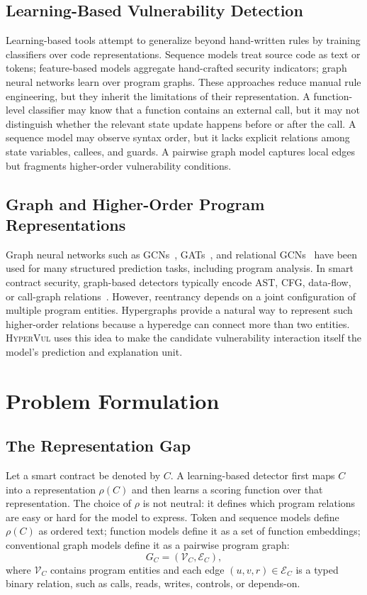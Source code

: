 \documentclass[conference]{IEEEtran}
\newcommand{\tool}{\textsc{HyperVul}}
\begin{document}
\subsection{Learning-Based Vulnerability Detection}
Learning-based tools attempt to generalize beyond hand-written rules by training classifiers over code representations. Sequence models treat source code as text or tokens; feature-based models aggregate hand-crafted security indicators; graph neural networks learn over program graphs. These approaches reduce manual rule engineering, but they inherit the limitations of their representation. A function-level classifier may know that a function contains an external call, but it may not distinguish whether the relevant state update happens before or after the call. A sequence model may observe syntax order, but it lacks explicit relations among state variables, callees, and guards. A pairwise graph model captures local edges but fragments higher-order vulnerability conditions.

\subsection{Graph and Higher-Order Program Representations}
Graph neural networks such as GCNs~\cite{kipf2017gcn}, GATs~\cite{velickovic2018gat}, and relational GCNs~\cite{schlichtkrull2018rgcn} have been used for many structured prediction tasks, including program analysis. In smart contract security, graph-based detectors typically encode AST, CFG, data-flow, or call-graph relations~\cite{zhuang2020gnn}. However, reentrancy depends on a joint configuration of multiple program entities. Hypergraphs provide a natural way to represent such higher-order relations because a hyperedge can connect more than two entities. \tool{} uses this idea to make the candidate vulnerability interaction itself the model's prediction and explanation unit.

\section{Problem Formulation}

\subsection{The Representation Gap}

Let a smart contract be denoted by $C$. A learning-based detector first maps $C$ into a representation $\rho(C)$ and then learns a scoring function over that representation. The choice of $\rho$ is not neutral: it defines which program relations are easy or hard for the model to express. Token and sequence models define $\rho(C)$ as ordered text; function models define it as a set of function embeddings; conventional graph models define it as a pairwise program graph:
\begin{equation}
G_C=(\mathcal{V}_C,\mathcal{E}_C),
\end{equation}
where $\mathcal{V}_C$ contains program entities and each edge $(u,v,r)\in\mathcal{E}_C$ is a typed binary relation, such as calls, reads, writes, controls, or depends-on.
\end{document}
